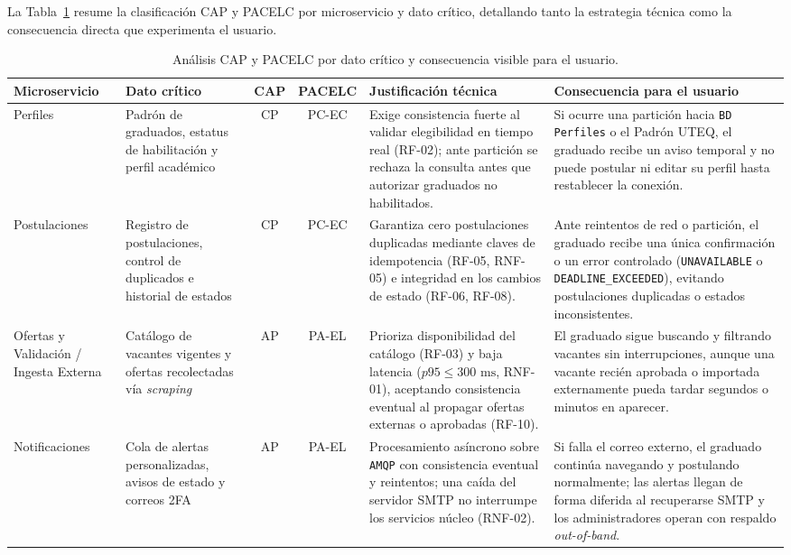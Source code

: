 \documentclass[11pt,a4paper]{article}
\begin{document}
La Tabla~\ref{tab:cap-pacelc} resume la clasificación CAP y PACELC por microservicio y dato crítico, detallando tanto la estrategia técnica como la consecuencia directa que experimenta el usuario.

\begin{table}[htbp]
\centering
\caption{Análisis CAP y PACELC por dato crítico y consecuencia visible para el usuario.}
\label{tab:cap-pacelc}
\footnotesize
\setlength{\tabcolsep}{3.5pt}
\begin{tabularx}{\textwidth}{>{\raggedright\arraybackslash}p{2.25cm} >{\raggedright\arraybackslash}p{2.35cm} c c >{\raggedright\arraybackslash}p{3.95cm} >{\raggedright\arraybackslash}X}
\toprule
\textbf{Microservicio} & \textbf{Dato crítico} & \textbf{CAP} & \textbf{PACELC} & \textbf{Justificación técnica} & \textbf{Consecuencia para el usuario} \\
\midrule
Perfiles & Padrón de graduados, estatus de habilitación y perfil académico & CP & PC-EC & Exige consistencia fuerte al validar elegibilidad en tiempo real (RF-02); ante partición se rechaza la consulta antes que autorizar graduados no habilitados. & Si ocurre una partición hacia \texttt{BD Perfiles} o el Padrón UTEQ, el graduado recibe un aviso temporal y no puede postular ni editar su perfil hasta restablecer la conexión. \\
\addlinespace
Postulaciones & Registro de postulaciones, control de duplicados e historial de estados & CP & PC-EC & Garantiza cero postulaciones duplicadas mediante claves de idempotencia (RF-05, RNF-05) e integridad en los cambios de estado (RF-06, RF-08). & Ante reintentos de red o partición, el graduado recibe una única confirmación o un error controlado (\texttt{UNAVAILABLE} o \texttt{DEADLINE\_EXCEEDED}), evitando postulaciones duplicadas o estados inconsistentes. \\
\addlinespace
Ofertas y Validación / Ingesta Externa & Catálogo de vacantes vigentes y ofertas recolectadas vía \textit{scraping} & AP & PA-EL & Prioriza disponibilidad del catálogo (RF-03) y baja latencia ($p95 \le 300\text{ ms}$, RNF-01), aceptando consistencia eventual al propagar ofertas externas o aprobadas (RF-10). & El graduado sigue buscando y filtrando vacantes sin interrupciones, aunque una vacante recién aprobada o importada externamente pueda tardar segundos o minutos en aparecer. \\
\addlinespace
Notificaciones & Cola de alertas personalizadas, avisos de estado y correos 2FA & AP & PA-EL & Procesamiento asíncrono sobre \texttt{AMQP} con consistencia eventual y reintentos; una caída del servidor SMTP no interrumpe los servicios núcleo (RNF-02). & Si falla el correo externo, el graduado continúa navegando y postulando normalmente; las alertas llegan de forma diferida al recuperarse SMTP y los administradores operan con respaldo \textit{out-of-band}. \\
\bottomrule
\end{tabularx}
\end{table}
\end{document}
